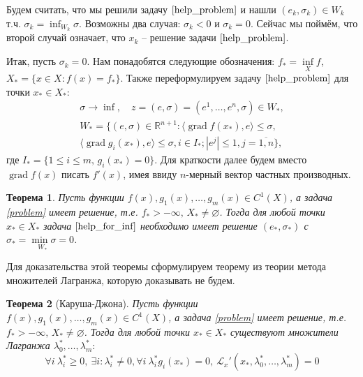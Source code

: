 \documentclass{article}
\theoremstyle{plain}
\newtheorem{theorem}{Теорема}[section]
\theoremstyle{definition}
\DeclareMathOperator{\grad}{grad}
\begin{document}
Будем считать, что мы решили задачу $\eqref{help_problem}$ и нашли $(e_k, \sigma_k)\in W_k$ т.ч. $\sigma_k=\inf_{W_k}\sigma$. Возможны два случая: $\sigma_k < 0$ и $\sigma_k = 0$. Сейчас мы поймём, что второй случай означает, что $x_k$ -- решение задачи $\eqref{help_problem}$.

Итак, пусть $\sigma_k = 0$. Нам понадобятся следующие обозначения:
$f_* = \underset{X}{\inf}f$, $X_* = \lbrace x \in X: f(x)=f_* \rbrace$.
Также переформулируем задачу $\eqref{help_problem}$ для точки $x_* \in X_*$:
\begin{multline}
\label{help_for_inf}
\sigma \rightarrow \inf,\quad z=(e, \sigma)=(e^1,\ldots,e^n,\sigma)\in W_*, \\
W_* = \lbrace (e,\sigma) \in \mathbb{R}^{n+1}: \langle \grad f(x_*), e \rangle \leqslant \sigma,\\
 \langle \grad g_i(x_*), e \rangle \leqslant \sigma, i \in I_*; |e^j| \leqslant 1, j=\overline{1,n} \rbrace,
\end{multline}
где $I_* = \lbrace 1 \leqslant i \leqslant m,\, g_i(x_*) = 0 \rbrace$.
Для краткости далее будем вместо $\grad f(x)$ писать $f'(x)$, имея ввиду $n$-мерный вектор частных производных.
\begin{theorem}
\label{main_th1}
Пусть функции $f(x), g_1(x), \ldots, g_m(x) \in C^1(X)$, а задача \eqref{problem} имеет решение, т.е. $f_* > -\infty,\, X_* \neq \varnothing$. Тогда для любой точки $x_* \in X_*$ задача $\eqref{help_for_inf}$
необходимо имеет решение $(e_*, \sigma_*)$ с $\sigma_*=\underset{W_*}{\min\sigma}=0$.
\end{theorem}
Для доказательства этой теоремы сформулируем теорему из теории метода множителей Лагранжа, которую доказывать не будем.
\begin{theorem}[Каруша-Джона]
\label{karush-john}
Пусть функции $f(x), g_1(x), \ldots, g_m(x) \in C^1(X)$, а задача \eqref{problem} имеет решение, т.е. $f_* > -\infty,\, X_* \neq \varnothing$. Тогда для любой точки $x_* \in X_*$ существуют множители Лагранжа $\lambda_0^*, \ldots, \lambda_m^*:$
\begin{equation*}
\forall i~ \lambda_i^* \geqslant 0,~ \exists i: \lambda_i^* \neq 0, \forall i~ \lambda_i^* g_i(x_*)=0,~ \mathcal{L}_x'(x_*,\lambda_0^*, \ldots, \lambda_m^*) = 0
\end{equation*}
\end{theorem}
\end{document}

